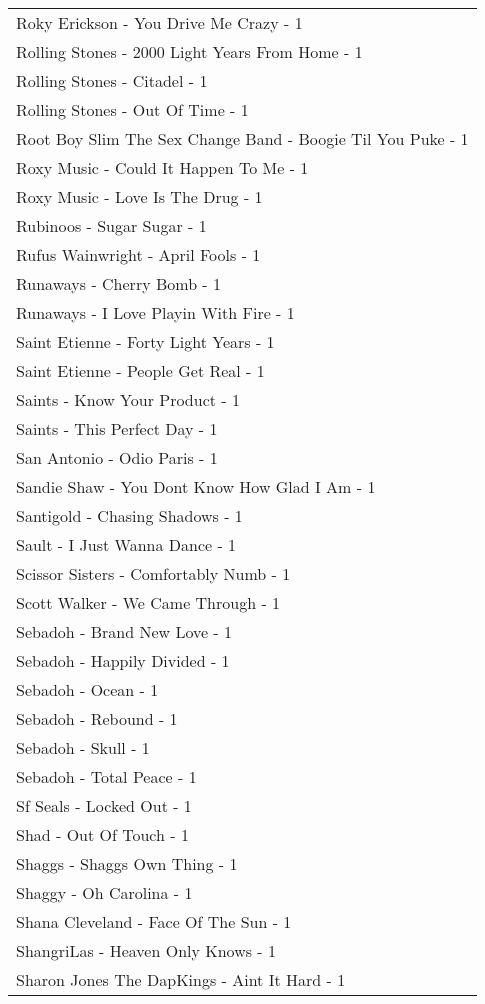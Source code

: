 \documentclass[
]{article}
\begin{document}
\begin{longtable}{l}
Roky Erickson - You Drive Me Crazy - 1 \\ 
Rolling Stones - 2000 Light Years From Home - 1 \\ 
Rolling Stones - Citadel - 1 \\ 
Rolling Stones - Out Of Time - 1 \\ 
Root Boy Slim The Sex Change Band - Boogie Til You Puke - 1 \\ 
Roxy Music - Could It Happen To Me - 1 \\ 
Roxy Music - Love Is The Drug - 1 \\ 
Rubinoos - Sugar Sugar - 1 \\ 
Rufus Wainwright - April Fools - 1 \\ 
Runaways - Cherry Bomb - 1 \\ 
Runaways - I Love Playin With Fire - 1 \\ 
Saint Etienne - Forty Light Years - 1 \\ 
Saint Etienne - People Get Real - 1 \\ 
Saints - Know Your Product - 1 \\ 
Saints - This Perfect Day - 1 \\ 
San Antonio - Odio Paris - 1 \\ 
Sandie Shaw - You Dont Know How Glad I Am - 1 \\ 
Santigold - Chasing Shadows - 1 \\ 
Sault - I Just Wanna Dance - 1 \\ 
Scissor Sisters - Comfortably Numb - 1 \\ 
Scott Walker - We Came Through - 1 \\ 
Sebadoh - Brand New Love - 1 \\ 
Sebadoh - Happily Divided - 1 \\ 
Sebadoh - Ocean - 1 \\ 
Sebadoh - Rebound - 1 \\ 
Sebadoh - Skull - 1 \\ 
Sebadoh - Total Peace - 1 \\ 
Sf Seals - Locked Out - 1 \\ 
Shad - Out Of Touch - 1 \\ 
Shaggs - Shaggs Own Thing - 1 \\ 
Shaggy - Oh Carolina - 1 \\ 
Shana Cleveland - Face Of The Sun - 1 \\ 
ShangriLas - Heaven Only Knows - 1 \\ 
Sharon Jones The DapKings - Aint It Hard - 1 \\ 

\end{longtable}
\end{document}

